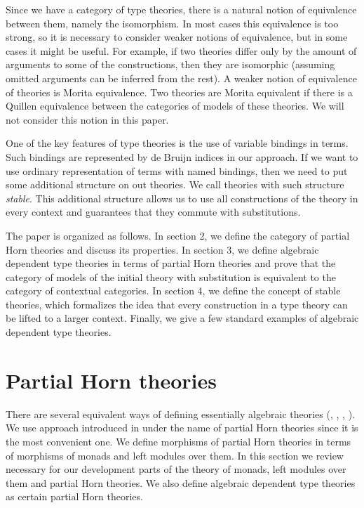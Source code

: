 \documentclass[reqno]{amsart}
\theoremstyle{definition}
\theoremstyle{remark}
\numberwithin{figure}{section}
\begin{document}
Since we have a category of type theories, there is a natural notion of equivalence between them, namely the isomorphism.
In most cases this equivalence is too strong, so it is necessary to consider weaker notions of equivalence, but in some cases it might be useful.
For example, if two theories differ only by the amount of arguments to some of the constructions,
then they are isomorphic (assuming omitted arguments can be inferred from the rest).
A weaker notion of equivalence of theories is Morita equivalence.
Two theories are Morita equivalent if there is a Quillen equivalence between the categories of models of these theories.
We will not consider this notion in this paper.

One of the key features of type theories is the use of variable bindings in terms.
Such bindings are represented by de Bruijn indices in our approach.
If we want to use ordinary representation of terms with named bindings, then we need to put some additional structure on out theories.
We call theories with such structure \emph{stable}.
This additional structure allows us to use all constructions of the theory in every context and guarantees that they commute with substitutions.

The paper is organized as follows.
In section 2, we define the category of partial Horn theories and discuss its properties.
In section 3, we define algebraic dependent type theories in terms of partial Horn theories and prove that the category of models of the initial theory with substitution is equivalent to the category of contextual categories.
In section 4, we define the concept of stable theories, which formalizes the idea that every construction in a type theory can be lifted to a larger context.
Finally, we give a few standard examples of algebraic dependent type theories.

\section{Partial Horn theories}
\label{sec:PHT}

There are several equivalent ways of defining essentially algebraic theories (\cite{LPC}, \cite{GAT}, \cite{PHL}, \cite[D 1.3.4]{elephant}).
We use approach introduced in \cite{PHL} under the name of partial Horn theories since it is the most convenient one.
We define morphisms of partial Horn theories in terms of morphisms of monads and left modules over them.
In this section we review necessary for our development parts of the theory of monads, left modules over them and partial Horn theories.
We also define algebraic dependent type theories as certain partial Horn theories.
\end{document}
